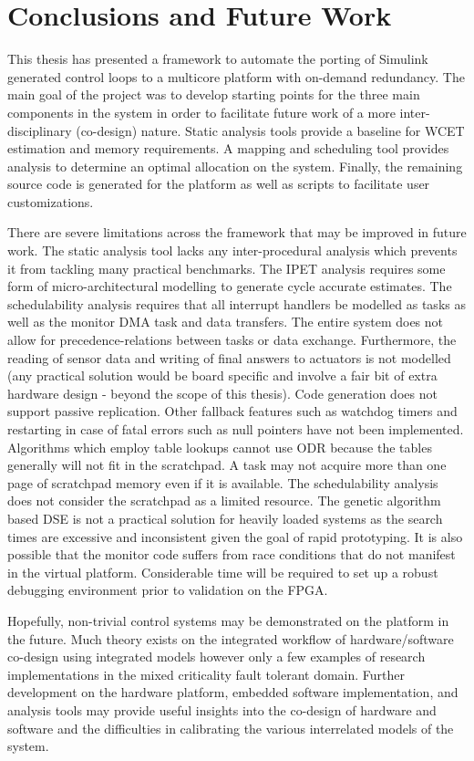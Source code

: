 
\chapter{Conclusions and Future Work} 

\label{c:concl} 

	This thesis has presented a framework to automate the porting of Simulink generated control loops to a multicore platform with on-demand redundancy.
	The main goal of the project was to develop starting points for the three main components in the system in order to facilitate future work of a more inter-disciplinary (co-design) nature. 
	Static analysis tools provide a baseline for WCET estimation and memory requirements. 
	A mapping and scheduling tool provides analysis to determine an optimal allocation on the system.
	Finally, the remaining source code is generated for the platform as well as scripts to facilitate user customizations.
	
	There are severe limitations across the framework that may be improved in future work.
	The static analysis tool lacks any inter-procedural analysis which prevents it from tackling many practical benchmarks.
	The IPET analysis requires some form of micro-architectural modelling to generate cycle accurate estimates.
	The schedulability analysis requires that all interrupt handlers be modelled as tasks as well as the monitor DMA task and data transfers.
	The entire system does not allow for precedence-relations between tasks or data exchange. 
	Furthermore, the reading of sensor data and writing of final answers to actuators is not modelled (any practical solution would be board specific and involve a fair bit of extra hardware design - beyond the scope of this thesis).
	Code generation does not support passive replication.
	Other fallback features such as watchdog timers and restarting in case of fatal errors such as null pointers have not been implemented.
	Algorithms which employ table lookups cannot use ODR because the tables generally will not fit in the scratchpad.
	A task may not acquire more than one page of scratchpad memory even if it is available.
	The schedulability analysis does not consider the scratchpad as a limited resource.
	The genetic algorithm based DSE is not a practical solution for heavily loaded systems as the search times are excessive and inconsistent given the goal of rapid prototyping. 
	It is also possible that the monitor code suffers from race conditions that do not manifest in the virtual platform. 
	Considerable time will be required to set up a robust debugging environment prior to validation on the FPGA.
	
	Hopefully, non-trivial control systems may be demonstrated on the platform in the future. 
	Much theory exists on the integrated workflow of hardware/software co-design using integrated models however only a few examples of research implementations in the mixed criticality fault tolerant domain.
	Further development on the hardware platform, embedded software implementation, and analysis tools may provide useful insights into the co-design of hardware and software and the difficulties in calibrating the various interrelated models of the system.
		